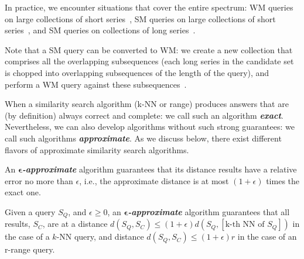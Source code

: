 In practice, we encounter situations that cover the entire spectrum: WM queries on large collections of short series~\cite{SENTINEL-2,url:sds}, SM queries on large collections of short series~\cite{url:adhd}, and SM queries on collections of long series~\cite{url/data/seismic}.

Note that a SM query can be converted to WM: we create a new collection that comprises all the overlapping subsequences (each long series in the candidate set is chopped into overlapping subsequences of the length of the query), and perform a WM query against these subsequences~\cite{ulisse,journal/vldb/linardi19}.

When a similarity search algorithm (k-NN or range) produces answers that are (by definition) always correct and complete: we call such an algorithm \textit{\textbf{exact}}.
Nevertheless, we can also develop algorithms without such strong guarantees: we call such algorithms \textit{\textbf{approximate}}.
As we discuss below, there exist different flavors of approximate similarity search algorithms.


An {\textit{\bf$\bm{\epsilon}$-approximate}} algorithm guarantees that its distance results have a relative error no more than $\epsilon$, i.e., the approximate distance is at most $(1+\epsilon)$ times the exact one. 

\begin{defn} \label{def:epsmatch}
Given a query $S_Q$, and $\epsilon \geq 0$, an \textit{\textbf{$\bm{\epsilon}$-approximate}} algorithm guarantees that all results, $S_C$, are at a distance $d(S_Q,S_C) \leq (1+\epsilon)d(S_Q,[\text{k-th NN of }S_Q])$ in the case of a $k$-NN query, and distance $d(S_Q,S_C) \leq (1+\epsilon)r$ in the case of an r-range query.
\end{defn}


